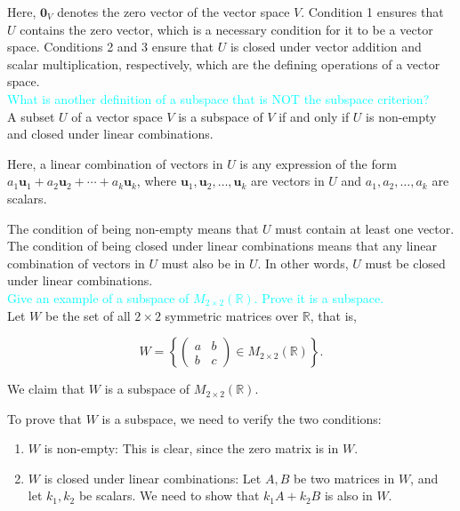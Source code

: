 \documentclass[fontsize=12pt]{scrartcl}
\begin{document}
Here, $\mathbf{0}_V$ denotes the zero vector of the vector space $V$. Condition 1 ensures that $U$ contains the zero vector, which is a necessary condition for it to be a vector space. Conditions 2 and 3 ensure that $U$ is closed under vector addition and scalar multiplication, respectively, which are the defining operations of a vector space.
\\

\noindent 
\textcolor{cyan}{What is another definition of a subspace that is NOT the subspace criterion?}\\

A subset $U$ of a vector space $V$ is a subspace of $V$ if and only if $U$ is non-empty and closed under linear combinations.

Here, a linear combination of vectors in $U$ is any expression of the form $a_1\mathbf{u}_1+a_2\mathbf{u}_2+\cdots+a_k\mathbf{u}_k$, where $\mathbf{u}_1,\mathbf{u}_2,\ldots,\mathbf{u}_k$ are vectors in $U$ and $a_1,a_2,\ldots,a_k$ are scalars.

The condition of being non-empty means that $U$ must contain at least one vector. The condition of being closed under linear combinations means that any linear combination of vectors in $U$ must also be in $U$. In other words, $U$ must be closed under linear combinations.
\\

\noindent
\textcolor{cyan}{Give an example of a subspace of $M_{2 \times 2}(\mathbb{R})$. Prove it is a subspace.}\\

Let $W$ be the set of all $2\times 2$ symmetric matrices over $\mathbb{R}$, that is,

$$W = \left\{\left(\begin{array}{cc}a & b\\b & c  \end{array} \right) \in M_{2\times2}(\mathbb{R}) \right\}.$$

We claim that $W$ is a subspace of $M_{2 \times 2}(\mathbb{R})$.

To prove that $W$ is a subspace, we need to verify the two conditions:

\begin{enumerate}
	\item $W$ is non-empty: This is clear, since the zero matrix is in $W$.
	\item $W$ is closed under linear combinations: Let $A,B$ be two matrices in $W$, and let $k_1,k_2$ be scalars. We need to show that $k_1A+k_2B$ is also in $W$.
\end{enumerate}
\end{document}
